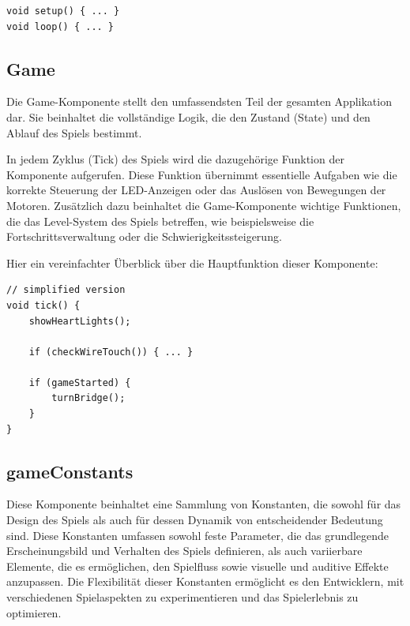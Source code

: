 \begin{minipage}{\linewidth}
\begin{lstlisting}
void setup() { ... }
void loop() { ... }
\end{lstlisting}
\end{minipage}

\subsection{Game}

Die Game-Komponente stellt den umfassendsten Teil der gesamten Applikation dar. Sie beinhaltet die vollständige Logik, die den Zustand (State) und den Ablauf des Spiels bestimmt.

In jedem Zyklus (Tick) des Spiels wird die dazugehörige Funktion der Komponente aufgerufen. Diese Funktion übernimmt essentielle Aufgaben wie die korrekte Steuerung der LED-Anzeigen oder das Auslösen von Bewegungen der Motoren. Zusätzlich dazu beinhaltet die Game-Komponente wichtige Funktionen, die das Level-System des Spiels betreffen, wie beispielsweise die Fortschrittsverwaltung oder die Schwierigkeitssteigerung.

Hier ein vereinfachter Überblick über die Hauptfunktion dieser Komponente:

\begin{minipage}{\linewidth}
\begin{lstlisting}
// simplified version
void tick() {
    showHeartLights();

    if (checkWireTouch()) { ... }
    
    if (gameStarted) {
        turnBridge();
    }
}
\end{lstlisting}
\end{minipage}

\subsection{gameConstants}

Diese Komponente beinhaltet eine Sammlung von Konstanten, die sowohl für das Design des Spiels als auch für dessen Dynamik von entscheidender Bedeutung sind. Diese Konstanten umfassen sowohl feste Parameter, die das grundlegende Erscheinungsbild und Verhalten des Spiels definieren, als auch variierbare Elemente, die es ermöglichen, den Spielfluss sowie visuelle und auditive Effekte anzupassen. Die Flexibilität dieser Konstanten ermöglicht es den Entwicklern, mit verschiedenen Spielaspekten zu experimentieren und das Spielerlebnis zu optimieren.

